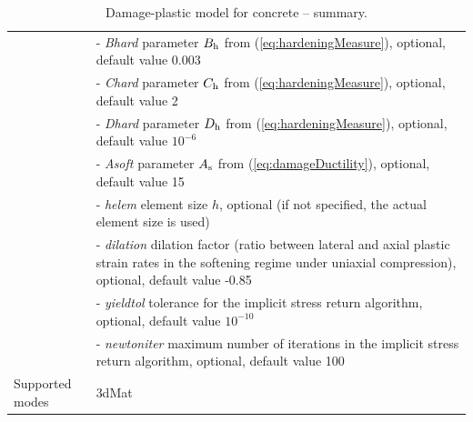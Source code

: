 \documentclass[a4paper]{article}
\newcommand{\param}[1]{{\it #1}}
\begin{document}
\begin{table}[!htb]
\begin{tabular}{|l|p{9cm}|}
&- \param{Bhard} parameter $B_{\rm h}$ from (\ref{eq:hardeningMeasure}), optional, default value 0.003\\
&- \param{Chard} parameter $C_{\rm h}$ from (\ref{eq:hardeningMeasure}), optional, default value 2\\
&- \param{Dhard} parameter $D_{\rm h}$ from (\ref{eq:hardeningMeasure}), optional, default value $10^{-6}$\\
&- \param{Asoft} parameter $A_{\rm s}$ from (\ref{eq:damageDuctility}), optional, default value 15\\
&- \param{helem} element size $h$, optional (if not specified, the actual element size is used)\\
&- \param{dilation} dilation factor (ratio between lateral and axial plastic strain rates in the softening regime under uniaxial compression), optional, default value -0.85\\
&- \param{yieldtol} tolerance for the implicit stress return algorithm, optional, default value $10^{-10}$\\
&- \param{newtoniter} maximum number of iterations in the implicit stress return algorithm, optional, default value 100\\
Supported modes& 3dMat\\
\hline
\end{tabular}
\caption{Damage-plastic model for concrete -- summary.}
\label{dpm_table}
\end{table}
\end{document}
